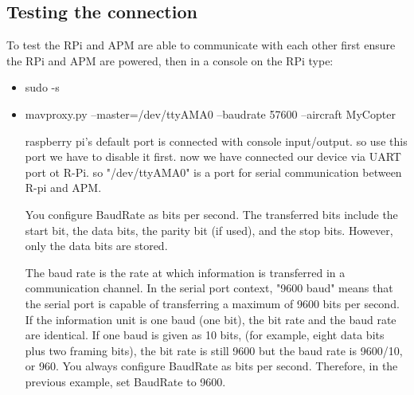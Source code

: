 \documentclass[11pt,a4paper]{article}
\begin{document}
			\subsection{Testing the connection}
			To test the RPi and APM are able to communicate with each other first ensure the RPi and APM are powered, then in a console on the RPi type:
			\begin{itemize}
				\item sudo -s
				\item mavproxy.py --master=/dev/ttyAMA0 --baudrate 57600 --aircraft MyCopter
				
				raspberry pi's default port is connected with console input/output. so use this port we have to disable it first. now we have connected our device via UART port ot R-Pi. so "/dev/ttyAMA0" is a port for serial communication between R-pi and APM. 
				
				You configure BaudRate as bits per second. The transferred bits include the start bit, the data bits, the parity bit (if used), and the stop bits. However, only the data bits are stored.
				
				The baud rate is the rate at which information is transferred in a communication channel. In the serial port context, "9600 baud" means that the serial port is capable of transferring a maximum of 9600 bits per second. If the information unit is one baud (one bit), the bit rate and the baud rate are identical. If one baud is given as 10 bits, (for example, eight data bits plus two framing bits), the bit rate is still 9600 but the baud rate is 9600/10, or 960. You always configure BaudRate as bits per second. Therefore, in the previous example, set BaudRate to 9600.
				

\end{itemize}
\end{document}
